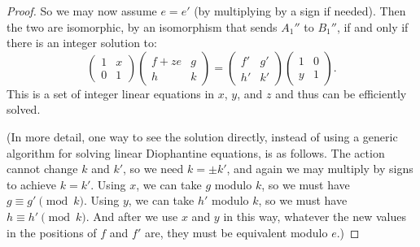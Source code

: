 \begin{proof}
So we may now assume $e = e'$ (by multiplying by a sign if needed). Then the two are isomorphic, by an isomorphism that sends $A_1''$ to $B_1''$, if and only if there is an integer solution to: %
\[
\begin{pmatrix} 1 & x \\ 0 & 1 \end{pmatrix}
\begin{pmatrix} f + ze & g \\ h & k \end{pmatrix}
=
\begin{pmatrix} f' & g' \\ h' & k' \end{pmatrix}
\begin{pmatrix} 1 & 0 \\ y & 1 \end{pmatrix}.
\]
This is a set of integer linear equations in $x$, $y$, and $z$ and thus can be efficiently solved.

(In more detail, one way to see the solution directly, instead of using a generic algorithm for solving linear Diophantine equations, is as follows. The action cannot change $k$ and $k'$, so we need $k = \pm k'$, and again we may multiply by signs to achieve $k = k'$. Using $x$, we can take $g$ modulo $k$, so we must have $g \equiv g' \pmod{k}$. Using $y$, we can take $h'$ modulo $k$, so we must have $h \equiv h' \pmod{k}$. And after we use $x$ and $y$ in this way, whatever the new values in the positions of $f$ and $f'$ are, they must be equivalent modulo $e$.)
\end{proof}




